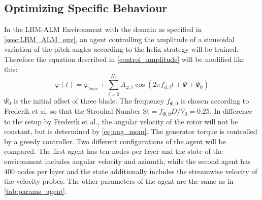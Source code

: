 \subsection{Optimizing Specific Behaviour}
\label{ssec:dyn_description}
In the LBM-ALM Environment with the domain as specified in \autoref{ssec:LBM_ALM_env}, an agent controlling the amplitude of a sinusoidal variation of the pitch angles according to the helix strategy will be trained. Therefore the equation described in \eqref{control_amplitude} will be modified like this:
\begin{equation}
	\varphi(t) = \varphi_{base} + \sum^{N_a}_{i=0} A_{\varphi,i} \cos(2 \pi f_{\phi,i} t + \Psi + \Psi_0)
\end{equation}
$\Psi_0$ is the initial offset of three blade. The frequency $f_{\Phi,0}$ is chosen according to Frederik et al. so that the Strouhal Number $\mathrm{St} = f_{\Phi, 0} D/V_0 = 0.25$. In difference to the setup by Frederik et al., the angular velocity of the rotor will not be constant, but is determined by \eqref{eq:ang_mom}. The generator torque is controlled by a greedy controller. Two different configurations of the agent will be compared. The first agent has ten nodes per layer and the state of the environment includes angular velocity and azimuth, while the second agent has $400$ nodes per layer and the state additionally includes the streamwise velocity of the velocity probes. The other parameters of the agent are the same as in \autoref{tab:params_agent}.
